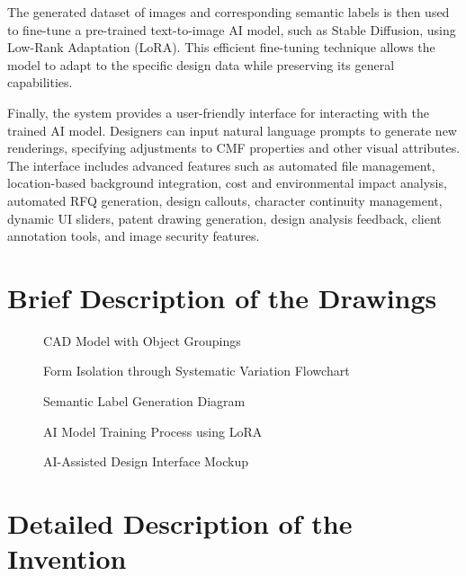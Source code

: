 \documentclass{article}
\begin{document}
The generated dataset of images and corresponding semantic labels is then used to fine-tune a pre-trained text-to-image AI model, such as Stable Diffusion, using Low-Rank Adaptation (LoRA). This efficient fine-tuning technique allows the model to adapt to the specific design data while preserving its general capabilities.

Finally, the system provides a user-friendly interface for interacting with the trained AI model. Designers can input natural language prompts to generate new renderings, specifying adjustments to CMF properties and other visual attributes. The interface includes advanced features such as automated file management, location-based background integration, cost and environmental impact analysis, automated RFQ generation, design callouts, character continuity management, dynamic UI sliders, patent drawing generation, design analysis feedback, client annotation tools, and image security features.

\section{Brief Description of the Drawings}

\begin{figure}[H]
    \centering
    \caption{CAD Model with Object Groupings}
    \label{fig:cad_model_groupings}
\end{figure}

\begin{figure}[H]
    \centering
    \caption{Form Isolation through Systematic Variation Flowchart}
    \label{fig:form_isolation_flowchart}
\end{figure}

\begin{figure}[H]
    \centering
    \caption{Semantic Label Generation Diagram}
    \label{fig:semantic_label_generation}
\end{figure}

\begin{figure}[H]
    \centering
    \caption{AI Model Training Process using LoRA}
    \label{fig:ai_model_training_lora}
\end{figure}

\begin{figure}[H]
    \centering
    \caption{AI-Assisted Design Interface Mockup}
    \label{fig:design_interface_mockup}
\end{figure}

\section{Detailed Description of the Invention}
\end{document}
